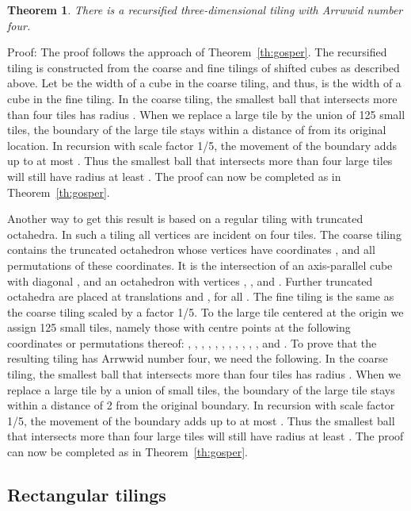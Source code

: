 \documentclass[11pt,a4paper]{article}
\newtheorem{theorem}{Theorem}
\newenvironment{proof}{Proof:}{\qed}
\def\squareforqed{\hbox{\rlap{}}}
\def\qed{\ifmmode\squareforqed\else{\unskip\nobreak\hfil
\penalty50\hskip1em\null\nobreak\hfil\squareforqed
\parfillskip=0pt\finalhyphendemerits=0\endgraf}\fi}
\begin{document}
\begin{theorem}
There is a recursified three-dimensional tiling with Arrwwid number four.
\end{theorem}
\begin{proof}
The proof follows the approach of Theorem~\ref{th:gosper}. The recursified tiling is constructed from the coarse and fine tilings of shifted cubes as described above. Let  be the width of a cube in the coarse tiling, and thus,  is the width of a cube in the fine tiling. In the coarse tiling, the smallest ball that intersects more than four tiles has radius . When we replace a large tile by the union of 125 small tiles, the boundary of the large tile stays within a distance of  from its original location. In recursion with scale factor 1/5, the movement of the boundary adds up to at most . Thus the smallest ball that intersects more than four large tiles will still have radius at least . The proof can now be completed as in Theorem~\ref{th:gosper}.
\end{proof}

Another way to get this result is based on a regular tiling with truncated octahedra. In such a tiling all vertices are incident on four tiles. The coarse tiling contains the truncated octahedron whose vertices have coordinates , and all permutations of these coordinates. It is the intersection of an axis-parallel cube with diagonal , and an octahedron with vertices , , and . Further truncated octahedra are placed at translations  and , for all . The fine tiling is the same as the coarse tiling scaled by a factor 1/5. To the large tile centered at the origin we assign 125 small tiles, namely those with centre points at the following coordinates or permutations thereof: , , , , , , , , , , , and . To prove that the resulting tiling has Arrwwid number four, we need the following. In the coarse tiling, the smallest ball that intersects more than four tiles has radius . When we replace a large tile by a union of small tiles, the boundary of the large tile stays within a distance of 2 from the original boundary. In recursion with scale factor 1/5, the movement of the boundary adds up to at most . Thus the smallest ball that intersects more than four large tiles will still have radius at least . The proof can now be completed as in Theorem~\ref{th:gosper}.

\subsection{Rectangular tilings}
\end{document}

